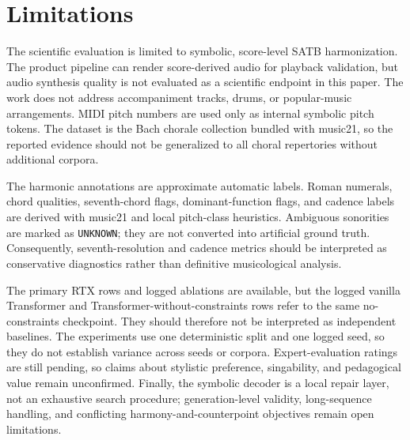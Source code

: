 \section{Limitations}

The scientific evaluation is limited to symbolic, score-level SATB harmonization. The product pipeline can render score-derived audio for playback validation, but audio synthesis quality is not evaluated as a scientific endpoint in this paper. The work does not address accompaniment tracks, drums, or popular-music arrangements. MIDI pitch numbers are used only as internal symbolic pitch tokens. The dataset is the Bach chorale collection bundled with music21, so the reported evidence should not be generalized to all choral repertories without additional corpora.

The harmonic annotations are approximate automatic labels. Roman numerals, chord qualities, seventh-chord flags, dominant-function flags, and cadence labels are derived with music21 and local pitch-class heuristics. Ambiguous sonorities are marked as \texttt{UNKNOWN}; they are not converted into artificial ground truth. Consequently, seventh-resolution and cadence metrics should be interpreted as conservative diagnostics rather than definitive musicological analysis.

The primary RTX rows and logged ablations are available, but the logged vanilla Transformer and Transformer-without-constraints rows refer to the same no-constraints checkpoint. They should therefore not be interpreted as independent baselines. The experiments use one deterministic split and one logged seed, so they do not establish variance across seeds or corpora. Expert-evaluation ratings are still pending, so claims about stylistic preference, singability, and pedagogical value remain unconfirmed. Finally, the symbolic decoder is a local repair layer, not an exhaustive search procedure; generation-level validity, long-sequence handling, and conflicting harmony-and-counterpoint objectives remain open limitations.
